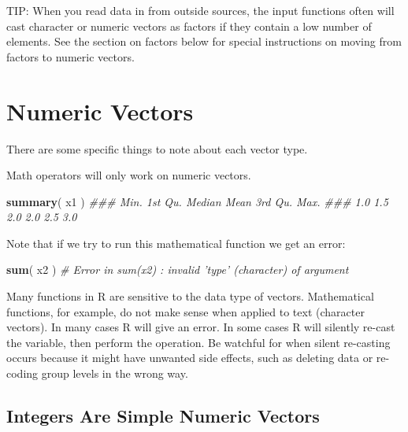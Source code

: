 \documentclass[]{book}
\newenvironment{Shaded}{\begin{snugshade}}{\end{snugshade}}
\newcommand{\CommentTok}[1]{\textcolor[rgb]{0.56,0.35,0.01}{\textit{#1}}}
\newcommand{\KeywordTok}[1]{\textcolor[rgb]{0.13,0.29,0.53}{\textbf{#1}}}
\newcommand{\NormalTok}[1]{#1}
\theoremstyle{definition}
\theoremstyle{definition}
\theoremstyle{definition}
\theoremstyle{remark}
\begin{document}
TIP: When you read data in from outside sources, the input functions
often will cast character or numeric vectors as factors if they contain
a low number of elements. See the section on factors below for special
instructions on moving from factors to numeric vectors.

\hypertarget{numeric-vectors}{%
\section{Numeric Vectors}\label{numeric-vectors}}

There are some specific things to note about each vector type.

Math operators will only work on numeric vectors.

\begin{Shaded}
\begin{Highlighting}[]

\KeywordTok{summary}\NormalTok{( x1 )}
\CommentTok{###    Min. 1st Qu.  Median    Mean 3rd Qu.    Max. }
\CommentTok{###     1.0     1.5     2.0     2.0     2.5     3.0}
\end{Highlighting}
\end{Shaded}

Note that if we try to run this mathematical function we get an error:

\begin{Shaded}
\begin{Highlighting}[]

\KeywordTok{sum}\NormalTok{( x2 ) }\CommentTok{# Error in sum(x2) : invalid 'type' (character) of argument}
\end{Highlighting}
\end{Shaded}

Many functions in R are sensitive to the data type of vectors.
Mathematical functions, for example, do not make sense when applied to
text (character vectors). In many cases R will give an error. In some
cases R will silently re-cast the variable, then perform the operation.
Be watchful for when silent re-casting occurs because it might have
unwanted side effects, such as deleting data or re-coding group levels
in the wrong way.

\hypertarget{integers-are-simple-numeric-vectors}{%
\subsection{Integers Are Simple Numeric
Vectors}\label{integers-are-simple-numeric-vectors}}
\end{document}
